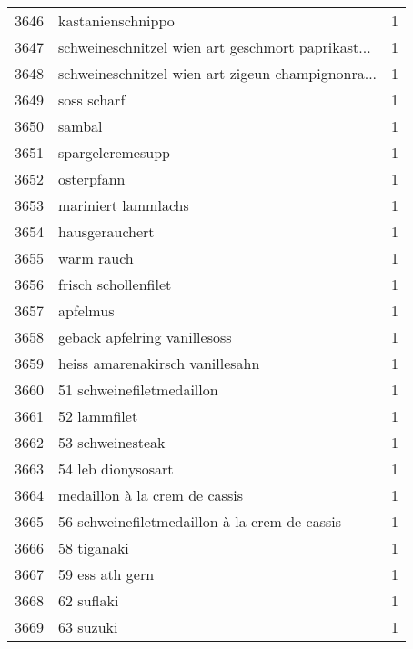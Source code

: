 \begin{tabular}{llr}
3646 &                                  kastanienschnippo &      1 \\
3647 &  schweineschnitzel wien art geschmort paprikast... &      1 \\
3648 &  schweineschnitzel wien art zigeun champignonra... &      1 \\
3649 &                                        soss scharf &      1 \\
3650 &                                             sambal &      1 \\
3651 &                                   spargelcremesupp &      1 \\
3652 &                                         osterpfann &      1 \\
3653 &                                mariniert lammlachs &      1 \\
3654 &                                     hausgerauchert &      1 \\
3655 &                                         warm rauch &      1 \\
3656 &                               frisch schollenfilet &      1 \\
3657 &                                           apfelmus &      1 \\
3658 &                       geback apfelring vanillesoss &      1 \\
3659 &                    heiss amarenakirsch vanillesahn &      1 \\
3660 &                          51 schweinefiletmedaillon &      1 \\
3661 &                                       52 lammfilet &      1 \\
3662 &                                   53 schweinesteak &      1 \\
3663 &                                 54 leb dionysosart &      1 \\
3664 &                      medaillon à la crem de cassis &      1 \\
3665 &      56 schweinefiletmedaillon à la crem de cassis &      1 \\
3666 &                                        58 tiganaki &      1 \\
3667 &                                    59 ess ath gern &      1 \\
3668 &                                         62 suflaki &      1 \\
3669 &                                          63 suzuki &      1 \\

\end{tabular}
